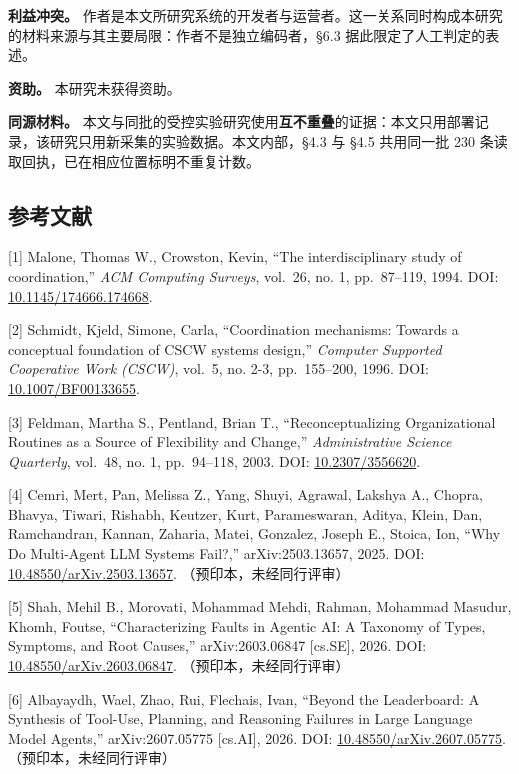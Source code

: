 \documentclass[
]{article}
\begin{document}
\textbf{利益冲突。}
作者是本文所研究系统的开发者与运营者。这一关系同时构成本研究的材料来源与其主要局限：作者不是独立编码者，§6.3
据此限定了人工判定的表述。

\textbf{资助。} 本研究未获得资助。

\textbf{同源材料。}
本文与同批的受控实验研究使用\textbf{互不重叠}的证据：本文只用部署记录，该研究只用新采集的实验数据。本文内部，§4.3
与 §4.5 共用同一批 230 条读取回执，已在相应位置标明不重复计数。

\subsection{参考文献}\label{ux53c2ux8003ux6587ux732e}

{[}1{]} Malone, Thomas W., Crowston, Kevin, ``The interdisciplinary
study of coordination,'' \emph{ACM Computing Surveys}, vol.~26, no. 1,
pp.~87--119, 1994. DOI:
\href{https://doi.org/10.1145/174666.174668}{10.1145/174666.174668}.

{[}2{]} Schmidt, Kjeld, Simone, Carla, ``Coordination mechanisms:
Towards a conceptual foundation of CSCW systems design,'' \emph{Computer
Supported Cooperative Work (CSCW)}, vol.~5, no. 2-3, pp.~155--200, 1996.
DOI: \href{https://doi.org/10.1007/BF00133655}{10.1007/BF00133655}.

{[}3{]} Feldman, Martha S., Pentland, Brian T., ``Reconceptualizing
Organizational Routines as a Source of Flexibility and Change,''
\emph{Administrative Science Quarterly}, vol.~48, no. 1, pp.~94--118,
2003. DOI: \href{https://doi.org/10.2307/3556620}{10.2307/3556620}.

{[}4{]} Cemri, Mert, Pan, Melissa Z., Yang, Shuyi, Agrawal, Lakshya A.,
Chopra, Bhavya, Tiwari, Rishabh, Keutzer, Kurt, Parameswaran, Aditya,
Klein, Dan, Ramchandran, Kannan, Zaharia, Matei, Gonzalez, Joseph E.,
Stoica, Ion, ``Why Do Multi-Agent LLM Systems Fail?,'' arXiv:2503.13657,
2025. DOI:
\href{https://doi.org/10.48550/arXiv.2503.13657}{10.48550/arXiv.2503.13657}.
（预印本，未经同行评审）

{[}5{]} Shah, Mehil B., Morovati, Mohammad Mehdi, Rahman, Mohammad
Masudur, Khomh, Foutse, ``Characterizing Faults in Agentic AI: A
Taxonomy of Types, Symptoms, and Root Causes,'' arXiv:2603.06847
{[}cs.SE{]}, 2026. DOI:
\href{https://doi.org/10.48550/arXiv.2603.06847}{10.48550/arXiv.2603.06847}.
（预印本，未经同行评审）

{[}6{]} Albayaydh, Wael, Zhao, Rui, Flechais, Ivan, ``Beyond the
Leaderboard: A Synthesis of Tool-Use, Planning, and Reasoning Failures
in Large Language Model Agents,'' arXiv:2607.05775 {[}cs.AI{]}, 2026.
DOI:
\href{https://doi.org/10.48550/arXiv.2607.05775}{10.48550/arXiv.2607.05775}.
（预印本，未经同行评审）
\end{document}
